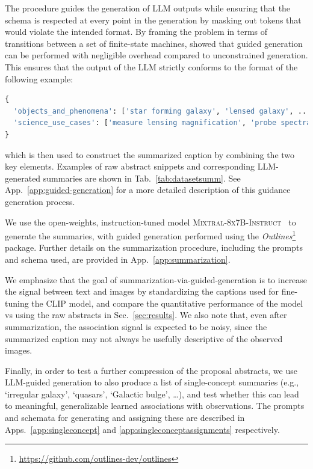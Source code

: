 \documentclass[10pt]{article} %
\newcommand{\package}[1]{\textsl{#1}\xspace}
\begin{document}
The procedure guides the generation of LLM outputs while ensuring that the schema is respected at every point in the generation by masking out tokens that would violate the intended format. By framing the problem in terms of transitions between a set of finite-state machines, \cite{willard2023efficient} showed that guided generation can be performed with negligible overhead compared to unconstrained generation. This ensures that the output of the LLM strictly conforms to the format of the following example:
\begin{lstlisting}[language=Python]
{
  'objects_and_phenomena': ['star forming galaxy', 'lensed galaxy', ...], 
  'science_use_cases': ['measure lensing magnification', 'probe spectral energy distributions', ...]
}
\end{lstlisting}
which is then used to construct the summarized caption by combining the two key elements. Examples of raw abstract snippets and corresponding LLM-generated summaries are shown in Tab.~\ref{tab:datasetsumm}. See App.~\ref{app:guided-generation} for a more detailed description of this guidance generation process.

We use the open-weights, instruction-tuned model \textsc{Mixtral-8x7B-Instruct}~\citep{jiang2024mixtral} to generate the summaries, with guided generation performed using the \package{Outlines}\footnote{\url{https://github.com/outlines-dev/outlines}} package. Further details on the summarization procedure, including the prompts and schema used, are provided in App.~\ref{app:summarization}.

We emphasize that the goal of summarization-via-guided-generation is to increase the signal between text and images by standardizing the captions used for fine-tuning the CLIP model, and compare the quantitative performance of the model vs using the raw abstracts in Sec.~\ref{sec:results}. We also note that, even after summarization, the association signal is expected to be noisy, since the summarized caption may not always be usefully descriptive of the observed images.

Finally, in order to test a further compression of the proposal abstracts, we use LLM-guided generation to also produce a list of single-concept summaries (e.g., `irregular galaxy', `quasars', `Galactic bulge', \ldots), and test whether this can lead to meaningful, generalizable learned associations with observations. The prompts and schemata for generating and assigning these are described in Apps.~\ref{app:singleconcept} and \ref{app:singleconceptassignments} respectively.
\end{document}

